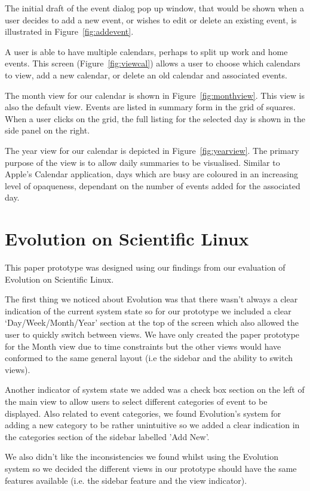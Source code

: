 \documentclass{article}
\begin{document}
The initial draft of the event dialog pop up window, that would be
shown when a user decides to add a new event, or wishes to edit or
delete an existing event, is illustrated in Figure~\ref{fig:addevent}.

A user is able to have multiple calendars, perhaps to split up work and
home events. This screen (Figure~\ref{fig:viewcal}) allows a user to
choose which calendars to view, add a new calendar, or delete an old
calendar and associated events.

The month view for our calendar is shown in Figure~\ref{fig:monthview}.
This view is also the default view. Events are listed in summary form
in the grid of squares. When a user clicks on the grid, the full listing
for the selected day is shown in the side panel on the right.

The year view for our calendar is depicted in Figure~\ref{fig:yearview}.
The primary purpose of the view is to allow daily summaries to be
visualised. Similar to Apple's Calendar application, days which are
busy are coloured in an increasing level of opaqueness, dependant on
the number of events added for the associated day.

\section{Evolution on Scientific Linux}

This paper prototype was designed using our findings from our evaluation 
of Evolution on Scientific Linux.

The first thing we noticed about Evolution was that there wasn't always
a clear indication of the current system state so for our prototype we
included a clear `Day/Week/Month/Year' section at the top of the screen
which also allowed the user to quickly switch between views. We have only
created the paper prototype for the Month view due to time constraints
but the other views would have conformed to the same general layout (i.e
the sidebar and the ability to switch views).

Another indicator of system state we added was a check box section on
the left of the main view to allow users to select different categories
of event to be displayed. Also related to event categories, we found
Evolution's system for adding a new category to be rather unintuitive
so we added a clear indication in the categories section of the sidebar
labelled 'Add New'.

We also didn't like the inconsistencies we found whilst using the
Evolution system so we decided the different views in our prototype
should have the same features available (i.e. the sidebar feature and
the view indicator).
\end{document}
